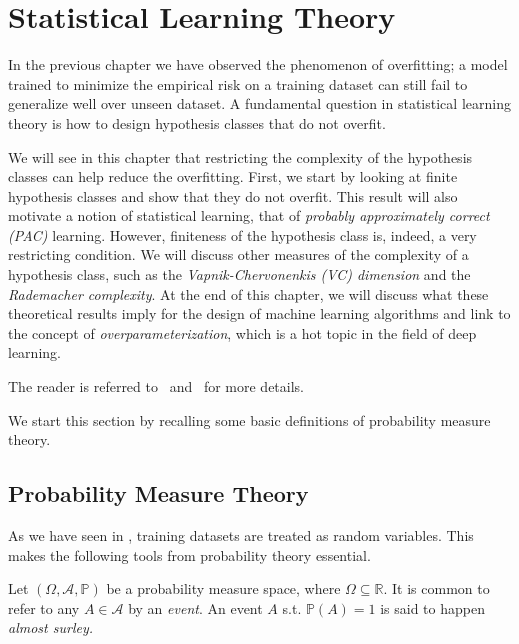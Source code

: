 \chapter{Statistical Learning Theory} %

\label{Chapter2} %
\setcounter{chapter}{2}
In the previous chapter we have observed the phenomenon of overfitting; a model
trained to minimize the empirical risk on a training dataset can still fail to generalize
well over unseen dataset. A fundamental question in statistical learning theory is how to design
hypothesis classes that do not overfit.  

We will see in this chapter that restricting the complexity of the hypothesis classes can help
reduce the overfitting. First, we start by looking at finite hypothesis classes
and show that they do not overfit. This result will also motivate a notion of statistical learning, that of \emph{probably approximately correct
(PAC)} learning. However, finiteness of the hypothesis class is, indeed, a very
restricting condition. We will discuss other measures of the complexity of a
hypothesis class, such as the \emph{Vapnik-Chervonenkis (VC) dimension} and the
\emph{Rademacher complexity}. At the end of this chapter, we will discuss what
these theoretical results imply for the design of machine learning algorithms and
link to the concept of \emph{overparameterization}, which is a hot topic in the field of deep learning.

The reader is referred to~\cite{Shalev:ML:2014} and~\cite{Shapire:ThML2019} for more details. 

We start this section by recalling some basic definitions of probability
measure theory.
\section{Probability Measure Theory}
As we have seen in , training datasets are treated as random
variables. This makes the following tools from probability theory essential. 

Let $(\Omega,\mathcal{A}, \mathbb{P})$ be a probability measure space, where $\Omega \subseteq \mathbb{R}$. 
It is common to refer to any $A \in \mathcal{A}$ by an \emph{event}. An event
$A$ s.t. $\mathbb{P}(A)=1$ is said to happen \emph{almost surley.}

